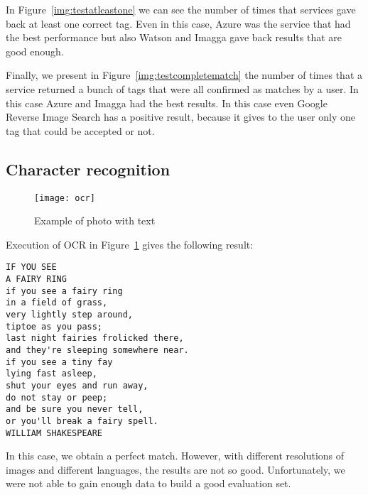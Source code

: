 In Figure~\ref{img:testatleastone} we can see the number of times that 
services gave back at least one correct tag. Even in this case, Azure was the 
service that had the best performance but also Watson and Imagga gave back 
results that are good enough.

Finally, we present in Figure~\ref{img:testcompletematch} the number of times 
that a service returned a bunch of tags that were all confirmed as matches by 
a user. In this case Azure and Imagga had the best results. In this case even 
Google Reverse Image Search has a positive result, because it gives to the user 
only one tag that could be accepted or not.

\subsection{Character recognition}

\begin{figure}[H]
\centering
\texttt{[image: ocr]}
\caption{Example of photo with text}
\label{testOCR}
\end{figure}

Execution of OCR in Figure~\ref{testOCR} gives the following result:
\begin{lstlisting}
IF YOU SEE
A FAIRY RING
if you see a fairy ring
in a field of grass,
very lightly step around,
tiptoe as you pass;
last night fairies frolicked there,
and they're sleeping somewhere near.
if you see a tiny fay
lying fast asleep,
shut your eyes and run away,
do not stay or peep;
and be sure you never tell,
or you'll break a fairy spell.
WILLIAM SHAKESPEARE
\end{lstlisting}

In this case, we obtain a perfect match. However, with different resolutions 
of images and different languages, the results are not so good. Unfortunately, 
we were not able to gain enough data to build a good evaluation set.